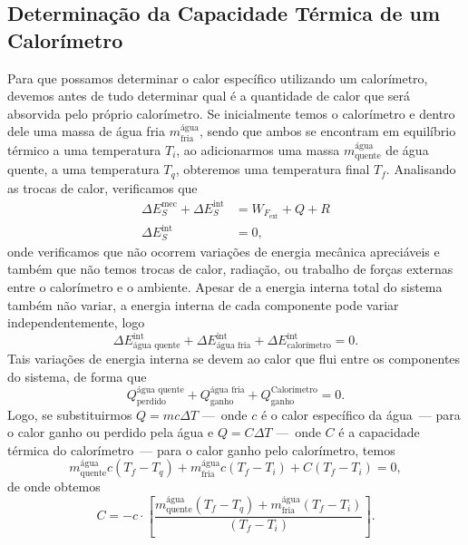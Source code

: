 \subsection{Determinação da Capacidade Térmica de um Calorímetro}

Para que possamos determinar o calor específico utilizando um calorímetro, devemos antes de tudo determinar qual é a quantidade de calor que será absorvida pelo próprio calorímetro. Se inicialmente temos o calorímetro e dentro dele uma massa de água fria $m_{\text{fria}}^{\text{água}}$, sendo que ambos se encontram em equilíbrio térmico a uma temperatura $T_i$, ao adicionarmos uma massa $m_{\text{quente}}^{\text{água}}$ de água quente, a uma temperatura $T_q$, obteremos uma temperatura final $T_f$. Analisando as trocas de calor, verificamos que
\begin{align}
    \Delta E_S^{\text{mec}} + \Delta E_S^{\text{int}} &= W_{F_{\text{ext}}} + Q + R \\
    \Delta E_S^{\text{int}} &= 0,
\end{align}
%
onde verificamos que não ocorrem variações de energia mecânica apreciáveis e também que não temos trocas de calor, radiação, ou trabalho de forças externas entre o calorímetro e o ambiente. Apesar de a energia interna total do sistema também não variar, a energia interna de cada componente pode variar independentemente, logo
\begin{equation}
    \Delta E_{\text{água quente}}^{\text{int}} + \Delta E_{\text{água fria}}^{\text{int}} + \Delta E_{\text{calorímetro}}^{\text{int}} = 0.
\end{equation}
%
Tais variações de energia interna se devem ao calor que flui entre os componentes do sistema, de forma que
\begin{equation}
	Q^{\text{água quente}}_{\text{perdido}} + Q^{\text{água fria}}_{\text{ganho}} + Q^{\text{Calorímetro}}_{\text{ganho}} = 0.
\end{equation}
%
Logo, se substituirmos $Q = mc\Delta T$ ---~onde $c$ é o calor específico da água~--- para o calor ganho ou perdido pela água e $Q = C\Delta T$ ---~onde $C$ é a capacidade térmica do calorímetro~--- para o calor ganho pelo calorímetro, temos
\begin{equation}
	m_{\text{quente}}^{\text{água}} c (T_f - T_q) + m_{\text{fria}}^{\text{água}} c (T_f - T_i) + C(T_f - T_i) = 0,
\end{equation}
%
de onde obtemos
\begin{equation}
	C = -c\cdot\left[\frac{m_{\text{quente}}^{\text{água}}(T_f - T_q)+m_{\text{fria}}^{\text{água}}(T_f - T_i)}{(T_f - T_i)}\right].
\end{equation}

